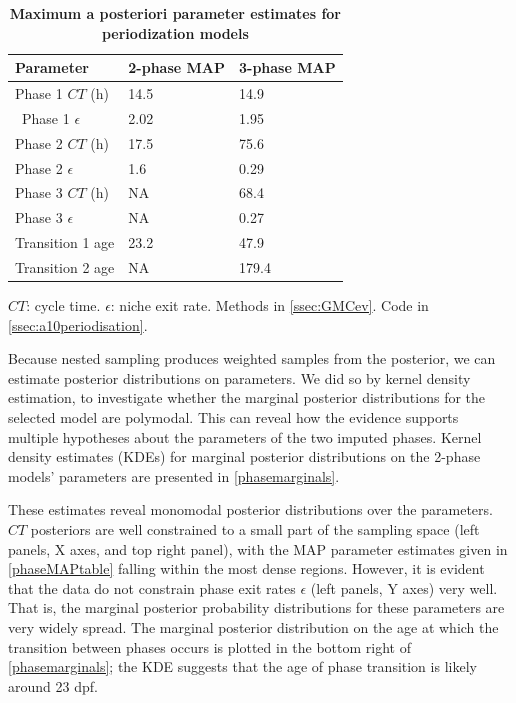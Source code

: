 \documentclass{ut-thesis}
\begin{document}
\begin{NoHyper}
\begin{table}[!ht]
    \centering
    \caption{{\bf Maximum a posteriori parameter estimates for periodization models}}
    \begin{tabular}{|l|l|l|}
        \hline
        {\bf Parameter} & {\bf 2-phase MAP} & {\bf 3-phase MAP}\\ \hline
        Phase 1 $CT$ (h) & 14.5 & 14.9\\ \hline\
        Phase 1 $\epsilon$ & 2.02 & 1.95\\ \hline
        Phase 2 $CT$ (h) & 17.5 & 75.6\\ \hline
        Phase 2 $\epsilon$ & 1.6 & 0.29\\ \hline
        Phase 3 $CT$ (h) & NA & 68.4\\ \hline
        Phase 3 $\epsilon$ & NA & 0.27\\ \hline
        Transition 1 age & 23.2 & 47.9\\ \hline
        Transition 2 age & NA & 179.4\\ \hline
    \end{tabular}
    \begin{flushleft}
        $CT$: cycle time.
        $\epsilon$: niche exit rate.
        Methods in \autoref{ssec:GMCev}.
        Code in \autoref{ssec:a10periodisation}.    
    \end{flushleft}
    \label{phaseMAPtable}
\end{table}

Because nested sampling produces weighted samples from the posterior, we can estimate posterior distributions on parameters. We did so by kernel density estimation, to investigate whether the marginal posterior distributions for the selected model are polymodal. This can reveal how the evidence supports multiple hypotheses about the parameters of the two imputed phases. Kernel density estimates (KDEs) for marginal posterior distributions on the 2-phase models' parameters are presented in \autoref{phasemarginals}. 

These estimates reveal monomodal posterior distributions over the parameters. $CT$ posteriors are well constrained to a small part of the sampling space (left panels, X axes, and top right panel), with the MAP parameter estimates given in \autoref{phaseMAPtable} falling within the most dense regions. However, it is evident that the data do not constrain phase exit rates $\epsilon$ (left panels, Y axes) very well. That is, the marginal posterior probability distributions for these parameters are very widely spread.  The marginal posterior distribution on the age at which the transition between phases occurs is plotted in the bottom right of \autoref{phasemarginals}; the KDE suggests that the age of phase transition is likely around 23 dpf.


\end{NoHyper}
\end{document}
